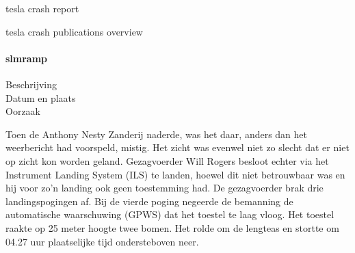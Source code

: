 tesla crash report



\cite{shepardson18062021TeslaDeaths}
\cite{hawkins30062021nhtsarequiresreporting}
\cite{hawkins10052021autopilotnotavailable}
\cite{szymkowski29062021nhtsaTeslaCrashReports}
\cite{abc1112052021AutopilotNotinTeslaCrash}
\cite{ankel18062021regulatorsinvestigateAutopilot}
\cite{sommerfield12072021NHTSAmandateresult}
\cite{saferoardsCrashesAutonomousvehicles}
\cite{stephardson18032021revieuwingtesla}
\cite{krishner30062021NHTSAreport}
\cite{gitlin11052021autopilot}
\cite{mitchell19012017investigationstop}
\cite{gordon10052021teslaprelimreport}
\cite{shaper07062018}
\cite{cochran18042021nodriverTeslaCrash}
\cite{habib28062016NHTSATeslaReport}
\cite{firstpress11052021fatalnonautopilot}
\cite{raynal20042021probeTeslaCrash}
\cite{tiungteslasoftwarecrash}
\cite{globaltimes08052021guangdongcrash}
\cite{anderson30042021secondteslacrash}
\cite{oremus21062017fatalTeslaCrash}
\cite{guardian15052021teslacrashHandsOnWheel}
\cite{Puzzanghera13092017TeslaSharesBlame}
\cite{jaillet02022017teslaAutopilotLimitations}
\cite{reuters03102019teslaAutoParkingFail}
\cite{dowling23042021}
\cite{young05112021fatalTeslaReport}
\cite{kierstein18032021teslaAutopilotCrashStationary}
\cite{janssen20062017teslacrashdetailflorida}

tesla crash publications overview

\paragraph{slmramp}

\begin{description}
\item[Beschrijving]
\item[Datum en plaats] 
\item[Oorzaak]
\end{description}
Toen de Anthony Nesty Zanderij naderde, was het daar, anders dan het weerbericht had voorspeld, mistig. Het zicht was evenwel niet zo slecht dat er niet op zicht kon worden geland. Gezagvoerder Will Rogers besloot echter via het Instrument Landing System (ILS) te landen, hoewel dit niet betrouwbaar was en hij voor zo'n landing ook geen toestemming had. De gezagvoerder brak drie landingspogingen af. Bij de vierde poging negeerde de bemanning de automatische waarschuwing (GPWS) dat het toestel te laag vloog. Het toestel raakte op 25 meter hoogte twee bomen. Het rolde om de lengteas en stortte om 04.27 uur plaatselijke tijd ondersteboven neer.

